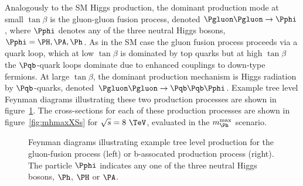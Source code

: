 Analogously to the \ac{SM} Higgs production, the dominant production mode at
small $\tan\beta$ is the gluon-gluon fusion process, denoted
$\Pgluon\Pgluon\to\Pphi$, where $\Pphi$ denotes any of the three neutral Higgs
bosons, $\Pphi=\PH,\PA,\Ph$. As in the \ac{SM} case the gluon fusion process
proceeds via a quark loop, which at low $\tan\beta$ is dominated by top quarks
but at high $\tan\beta$ the $\Pqb$-quark loops dominate due to enhanced couplings to
down-type fermions. At large $\tan\beta$, the dominant production mechanism is
Higgs radiation by $\Pqb$-quarks, denoted $\Pgluon\Pgluon\to\Pqb\Pqb\Pphi$.
Example tree level Feynman diagrams illustrating these two production processes
are shown in figure~\ref{fig:mssmfeynman}. The cross-sections for each of these 
production processes are shown in
figure~\ref{fig:mhmaxXSs} for $\sqrt{s}=8~\TeV$, evaluated in the $m_{\Ph}^{\text{max}}$
scenario.

\begin{figure}[htbp]
\caption{Feynman diagrams illustrating example tree level production for the
gluon-fusion process (left) or b-assocated production process (right). The
particle $\Pphi$ indicates any one of the three neutral Higgs bosons, $\Ph$,
$\PH$ or $\PA$.}
\label{fig:mssmfeynman}
\end{figure}

